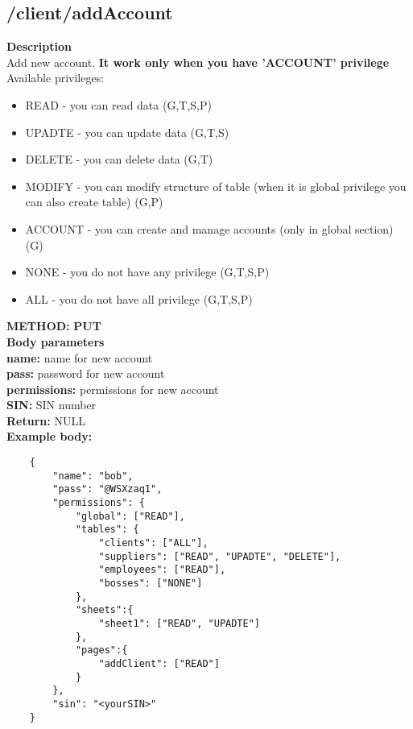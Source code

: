 \documentclass[a4paper, 12pt]{report}
\begin{document}
\subsection{/client/addAccount}
\textbf{\color{redText} Description} \\
Add new account. \textbf{It work only when you have 'ACCOUNT' privilege}\\
Available privileges:
\begin{itemize}
    \item READ    - you can read data (G,T,S,P)
    \item UPADTE  - you can update data (G,T,S)
    \item DELETE  - you can delete data (G,T)
    \item MODIFY  - you can modify structure of table (when it is global privilege you can also create table) (G,P)
    \item ACCOUNT - you can create and manage accounts (only in global section) (G)
    \item NONE    - you do not have any privilege (G,T,S,P)
    \item ALL     - you do not have all privilege (G,T,S,P)
\end{itemize}
\textbf{\color{redText} METHOD: } \textbf{PUT} \\
\textbf{\color{redText} Body parameters} \\
\textbf{name: } name for new account\\
\textbf{pass: } password for new account\\
\textbf{permissions: } permissions for new account\\
\textbf{SIN: } SIN number\\
\textbf{\color{redText} Return: } NULL\\
\textbf{\color{redText} Example body: }
\begin{lstlisting}
    {
        "name": "bob",
        "pass": "@WSXzaq1",
        "permissions": {
            "global": ["READ"],
            "tables": {
                "clients": ["ALL"],
                "suppliers": ["READ", "UPADTE", "DELETE"],
                "employees": ["READ"],
                "bosses": ["NONE"]
            },
            "sheets":{
                "sheet1": ["READ", "UPADTE"]
            },
            "pages":{
                "addClient": ["READ"]
            }
        },
        "sin": "<yourSIN>"
    }
\end{lstlisting}
\end{document}
